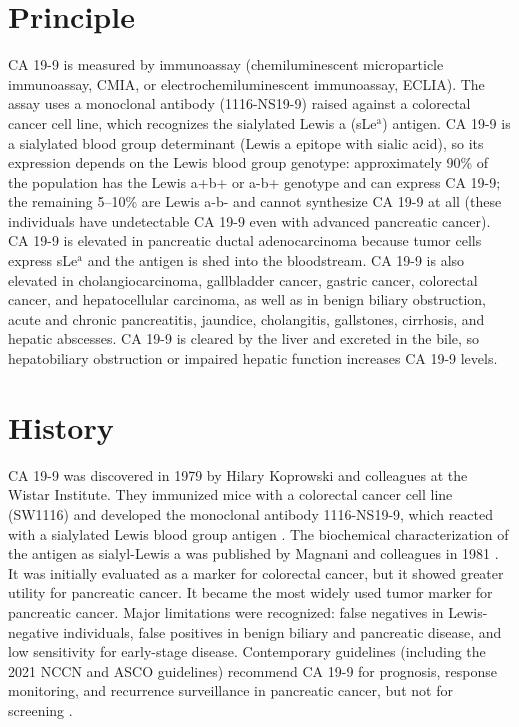 \section*{Principle}
CA 19-9 is measured by immunoassay (chemiluminescent microparticle immunoassay, CMIA, or electrochemiluminescent immunoassay, ECLIA). The assay uses a monoclonal antibody (1116-NS19-9) raised against a colorectal cancer cell line, which recognizes the sialylated Lewis a (sLe$^\text{a}$) antigen. CA 19-9 is a sialylated blood group determinant (Lewis a epitope with sialic acid), so its expression depends on the Lewis blood group genotype: approximately 90\% of the population has the Lewis a+b+ or a-b+ genotype and can express CA 19-9; the remaining 5--10\% are Lewis a-b- and cannot synthesize CA 19-9 at all (these individuals have undetectable CA 19-9 even with advanced pancreatic cancer). CA 19-9 is elevated in pancreatic ductal adenocarcinoma because tumor cells express sLe$^\text{a}$ and the antigen is shed into the bloodstream. CA 19-9 is also elevated in cholangiocarcinoma, gallbladder cancer, gastric cancer, colorectal cancer, and hepatocellular carcinoma, as well as in benign biliary obstruction, acute and chronic pancreatitis, jaundice, cholangitis, gallstones, cirrhosis, and hepatic abscesses. CA 19-9 is cleared by the liver and excreted in the bile, so hepatobiliary obstruction or impaired hepatic function increases CA 19-9 levels.

\section*{History}
CA 19-9 was discovered in 1979 by Hilary Koprowski and colleagues at the Wistar Institute. They immunized mice with a colorectal cancer cell line (SW1116) and developed the monoclonal antibody 1116-NS19-9, which reacted with a sialylated Lewis blood group antigen \cite{koprowski1979}. The biochemical characterization of the antigen as sialyl-Lewis a was published by Magnani and colleagues in 1981 \cite{magnani1981}. It was initially evaluated as a marker for colorectal cancer, but it showed greater utility for pancreatic cancer. It became the most widely used tumor marker for pancreatic cancer. Major limitations were recognized: false negatives in Lewis-negative individuals, false positives in benign biliary and pancreatic disease, and low sensitivity for early-stage disease. Contemporary guidelines (including the 2021 NCCN and ASCO guidelines) recommend CA 19-9 for prognosis, response monitoring, and recurrence surveillance in pancreatic cancer, but not for screening \cite{tempero2021}.

